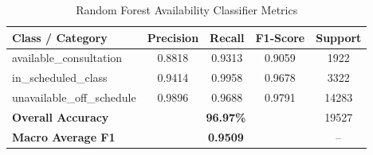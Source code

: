 \begin{table}[htbp]
\centering
\caption{Random Forest Availability Classifier Metrics}
\begin{tabular}{lcccc}
\hline
\textbf{Class / Category} & \textbf{Precision} & \textbf{Recall} & \textbf{F1-Score} & \textbf{Support} \\
\hline
available\_consultation & 0.8818 & 0.9313 & 0.9059 & 1922 \\
in\_scheduled\_class & 0.9414 & 0.9958 & 0.9678 & 3322 \\
unavailable\_off\_schedule & 0.9896 & 0.9688 & 0.9791 & 14283 \\
\hline
\textbf{Overall Accuracy} & \multicolumn{3}{c}{\textbf{96.97\%}} & 19527 \\
\textbf{Macro Average F1} & \multicolumn{3}{c}{\textbf{0.9509}} & -- \\
\hline
\end{tabular}
\label{tab:model_performance}
\end{table}
